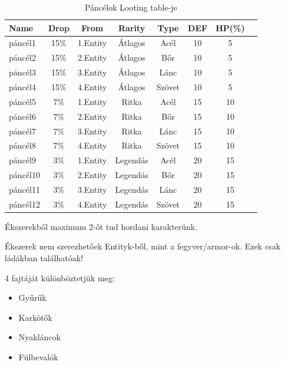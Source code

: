 \begin{table}[!ht]
\centering
\caption{Páncélok Looting table-je}
\label{tab:table4}
\begin{tabular}{|l|c|c|c|c|c|c|c|}
\hline
 Name & Drop & From  & Rarity & Type & DEF & HP(\%) \\
\hline
 páncél1 & 15\% & 1.Entity & Átlagos & Acél & 10 & 5 \\
\hline
 páncél2 & 15\% & 2.Entity & Átlagos & Bőr & 10 & 5 \\
\hline
 páncél3 & 15\% & 3.Entity & Átlagos & Lánc& 10 & 5\\
\hline
 páncél4 & 15\% & 4.Entity & Átlagos  & Szövet & 10 & 5\\
\hline
 páncél5 & 7\% & 1.Entity & Ritka & Acél & 15 & 10 \\
\hline
 páncél6 & 7\% & 2.Entity & Ritka & Bőr & 15 & 10 \\
\hline
 páncél7 & 7\% & 3.Entity & Ritka & Lánc & 15 & 10 \\
\hline
 páncél8 & 7\% & 4.Entity & Ritka  & Szövet & 15 & 10\\
 \hline
 páncél9 & 3\% & 1.Entity & Legendás & Acél & 20 & 15 \\
\hline
 páncél10 & 3\% & 2.Entity & Legendás & Bőr & 20 & 15 \\
\hline
 páncél11 & 3\% & 3.Entity & Legendás & Lánc & 20 & 15\\
\hline
 páncél12 & 3\% & 4.Entity & Legendás  & Szövet & 20 & 15\\
\hline
\end{tabular}
\end{table}

\noindent Ékszerekből maximum 2-őt tud hordani karakterünk.

\noindent Ékszerek nem szerezhetőek Entityk-ből, mint a fegyver/armor-ok. Ezek csak ládákban találhatóak!

4 fajtáját különböztetjük meg:

\begin{itemize}
  \item Gyűrűk
  \item Karkötők
  \item Nyakláncok
  \item Fülbevalók
\end{itemize}

